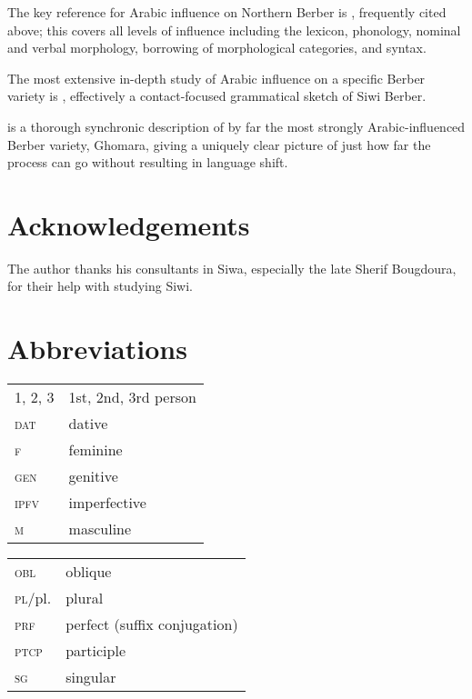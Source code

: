 \documentclass[output=paper]{langsci/langscibook}
\begin{document}
The key reference for Arabic influence on Northern Berber is \citet{Kossmann2012}, frequently cited above; this covers all levels of influence including the lexicon, phonology, nominal and verbal morphology, borrowing of morphological categories, and syntax.

The most extensive in-depth study of Arabic influence on a specific Berber variety is \citet{Souag2013book}, effectively a contact-focused grammatical sketch of Siwi Berber.

\citet{Mourigh2016} is a thorough synchronic description of by far the most strongly Arabic-influenced Berber variety, Ghomara, giving a uniquely clear picture of just how far the process can go without resulting in language shift.

\section*{Acknowledgements}

The author thanks his consultants in Siwa, especially the late Sherif Bougdoura, for their help with studying Siwi.

\section*{Abbreviations}
\begin{tabularx}{.5\textwidth}{@{}lQ@{}}
\textsc{1, 2, 3} & 1st, 2nd, 3rd person \\
\textsc{dat} & dative \\
\textsc{f} & feminine \\
\textsc{gen} & genitive \\
\textsc{ipfv} & imperfective  \\
\textsc{m} & masculine \\
\end{tabularx}%
\begin{tabularx}{.5\textwidth}{@{}lQ@{}}
\textsc{obl} & oblique \\
\textsc{pl}/pl. & plural \\
\textsc{prf} & perfect (suffix conjugation) \\
\textsc{ptcp} & participle \\
\textsc{sg} & singular \\
\end{tabularx}%
 

\sloppy
\printbibliography[heading=subbibliography,notkeyword=this]
\end{document}
